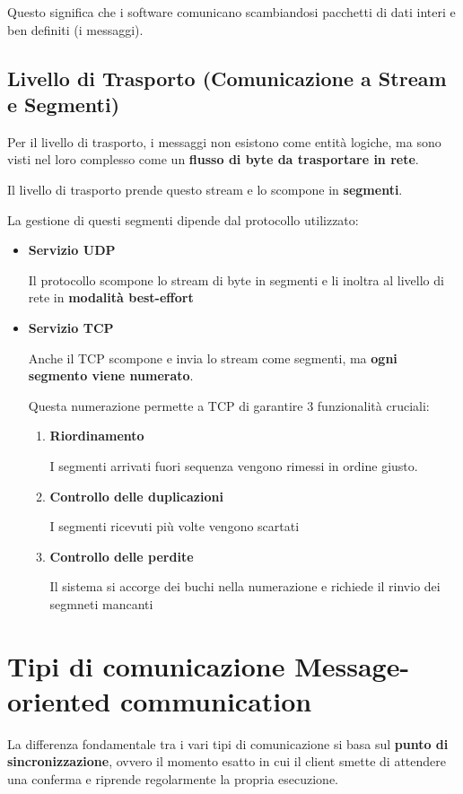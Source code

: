Questo significa che i software comunicano scambiandosi pacchetti di dati interi e ben definiti (i messaggi).

\subsection{Livello di Trasporto (Comunicazione a Stream e Segmenti)}
Per il livello di trasporto, i messaggi non esistono come entità logiche, ma sono visti nel loro complesso come un \textbf{flusso di byte da trasportare in rete}.

Il livello di trasporto prende questo stream e lo scompone in \textbf{segmenti}.

La gestione di questi segmenti dipende dal protocollo utilizzato:

\begin{itemize}
    \item \textbf{Servizio UDP}

    Il protocollo scompone lo stream di byte in segmenti e li inoltra al livello di rete in \textbf{modalità best-effort}

    \item \textbf{Servizio TCP}

    Anche il TCP scompone e invia lo stream come segmenti, ma \textbf{ogni segmento viene numerato}.

    Questa numerazione permette a TCP di garantire 3 funzionalità cruciali:
    \begin{enumerate}
        \item \textbf{Riordinamento}

        I segmenti arrivati fuori sequenza vengono rimessi in ordine giusto.

        \item \textbf{Controllo delle duplicazioni}

        I segmenti ricevuti più volte vengono scartati

        \item \textbf{Controllo delle perdite}

        Il sistema si accorge dei buchi nella numerazione e richiede il rinvio dei segmneti mancanti
    \end{enumerate}
\end{itemize}

\newpage

\section{Tipi di comunicazione Message-oriented communication}
La differenza fondamentale tra i vari tipi di comunicazione si basa sul \textbf{punto di sincronizzazione}, ovvero il momento esatto in cui il client smette di attendere una conferma e riprende regolarmente la propria esecuzione.

